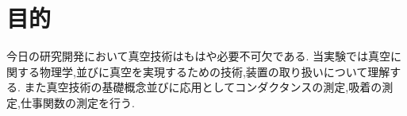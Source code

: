 \documentclass[uplatex,a4j,11pt,dvipdfmx,draft]{jsarticle}
\begin{document}
\section{目的}
今日の研究開発において真空技術はもはや必要不可欠である.
当実験では真空に関する物理学,並びに真空を実現するための技術,装置の取り扱いについて理解する.
また真空技術の基礎概念並びに応用としてコンダクタンスの測定,吸着の測定,仕事関数の測定を行う.
\newpage

\newpage
\newpage


\end{document}
